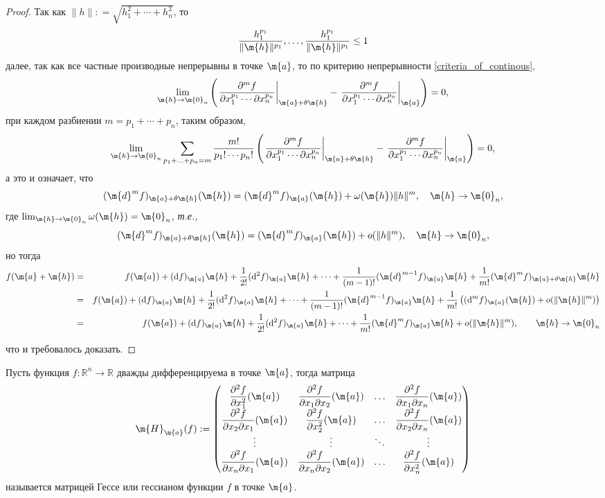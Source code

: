\begin{proof}
Так как $\| h \|: = \sqrt{h_1^2 + \cdots + h_n^2}$, то 
\[
 \frac{h_1^{p_1}}{\| \m{h}\|^{p_1}}, \ldots, \frac{h_1^{p_1}}{\| \m{h}\|^{p_1}} \le 1 
\]
далее, так как все частные производные непрерывны в точке $\m{a}$, то по критерию непрерывности \ref{criteria_of_continous},
\[
 \lim_{\m{h} \to \m{0}_n} \left( \left.\frac{\partial^m f}{\partial x_1^{p_1} \cdots \partial x_n^{p_n}}\right|_{\m{a}+\theta \m{h}} - \left.\frac{\partial^m f}{\partial x_1^{p_1} \cdots \partial x_n^{p_n}}\right|_{\m{a}} \right) = 0, 
\]
при каждом разбиении $m = p_1 + \cdots + p_n$, таким образом, 
\[
 \lim_{\m{h} \to \m{0}_n} \sum_{p_1 + \ldots + p_n = m} \dfrac{m!}{p_1! \cdots p_n!}\left( \left.\frac{\partial^m f}{\partial x_1^{p_1} \cdots \partial x_n^{p_n}}\right|_{\m{a}+\theta \m{h}} - \left.\frac{\partial^m f}{\partial x_1^{p_1} \cdots \partial x_n^{p_n}}\right|_{\m{a}} \right) = 0,
\]
а это и означает, что 
\[
 (\m{d}^{m}f)_{\m{a}+ \theta \m{h}}(\m{h}) = (\m{d}^{m}f)_{\m{a}}(\m{h}) + \omega(\m{h}) \|h\|^m, \quad \m{h} \to \m{0}_n,
\]
где $\lim_{\m{h} \to \m{0}_n} \omega(\m{h}) = \m{0}_n$, \textit{т.е.,}
\[
 (\m{d}^{m}f)_{\m{a}+ \theta \m{h}}(\m{h}) = (\m{d}^{m}f)_{\m{a}}(\m{h}) + o(\|h\|^m), \quad \m{h} \to \m{0}_n,
\]
но тогда
\begin{eqnarray*}
    f(\m{a} + \m{h}) &=& f(\m{a}) + (\mathrm{d}f)_\m{a} \m{h} + \frac{1}{2!} (\mathrm{d}^2f)_\m{a}\m{h} + \cdots + \frac{1}{(m-1)!} (\m{d}^{m-1}f)_\m{a}\m{h} + \frac{1}{m!} (\m{d}^{m}f)_{\m{a}+ \theta \m{h}}\m{h} \\
    &=&f(\m{a}) + (\mathrm{d}f)_\m{a} \m{h} + \frac{1}{2!} (\mathrm{d}^2f)_\m{a}\m{h} + \cdots + \frac{1}{(m-1)!} (\m{d}^{m-1}f)_\m{a}\m{h} + \frac{1}{m!}\left( (\mathrm{d}^mf)_\m{a} (\m{h}) + o(\|\m{h}\|^m) \right) \\
    &=&f(\m{a}) + (\mathrm{d}f)_\m{a} \m{h} + \frac{1}{2!} (\mathrm{d}^2f)_\m{a}\m{h} + \cdots + \frac{1}{m!} (\m{d}^mf)_\m{a}\m{h} + o(\| \m{h} \|^m), \qquad \m{h} \to \m{0}_n
\end{eqnarray*}

что и требовалось доказать.
\end{proof}

\begin{definition}
    Пусть функция $f:\mathbb{R}^n \to \mathbb{R}$ дважды дифференцируема в точке $\m{a}$, тогда матрица
    \[
     \m{H}_\m{a}(f): = \begin{pmatrix}
         \dfrac{\partial^2 f}{\partial x_1^2}(\m{a}) & \dfrac{\partial^2 f}{\partial x_1 \partial x_2}(\m{a}) &\ldots & \dfrac{\partial^2 f}{\partial x_1 \partial x_n}(\m{a}) \\
         \dfrac{\partial^2 f}{\partial x_2 \partial x_1}(\m{a}) & \dfrac{\partial^2 f}{\partial x_2^2}(\m{a}) & \ldots & \dfrac{\partial^2 f}{\partial x_2 \partial x_n}(\m{a}) \\
         \vdots & \vdots & \ddots & \vdots \\
         \dfrac{\partial^2 f}{\partial x_n \partial x_1}(\m{a}) & \dfrac{\partial^2 f}{\partial x_n \partial x_2}(\m{a}) & \ldots &\dfrac{\partial^2 f}{ \partial x_n^2}(\m{a})
     \end{pmatrix}
    \]
    называется матрицей Гессе или гессианом функции $f$ в точке $\m{a}$.
\end{definition}

